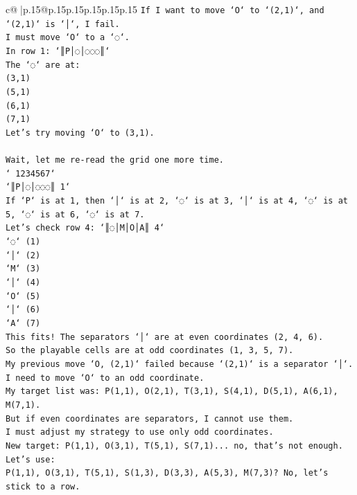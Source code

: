\documentclass{article}
\begin{document}
{\begin{supertabular}{c@{$\;$}|p{.15\linewidth}@{}p{.15\linewidth}p{.15\linewidth}p{.15\linewidth}p{.15\linewidth}p{.15\linewidth}}
{{{\texttt{If I want to move `O` to `(2,1)`, and `(2,1)` is `│`, I fail.} \\
\texttt{I must move `O` to a `◌`.} \\
\texttt{In row 1: `║P│◌│◌◌◌║`} \\
\texttt{The `◌` are at:} \\
\texttt{(3,1)} \\
\texttt{(5,1)} \\
\texttt{(6,1)} \\
\texttt{(7,1)} \\
\texttt{Let's try moving `O` to (3,1).} \\
\\ 
\texttt{Wait, let me re{-}read the grid one more time.} \\
\texttt{` 1234567`} \\
\texttt{`║P│◌│◌◌◌║ 1`} \\
\texttt{If `P` is at 1, then `│` is at 2, `◌` is at 3, `│` is at 4, `◌` is at 5, `◌` is at 6, `◌` is at 7.} \\
\texttt{Let's check row 4: `║◌│M│O│A║ 4`} \\
\texttt{`◌` (1)} \\
\texttt{`│` (2)} \\
\texttt{`M` (3)} \\
\texttt{`│` (4)} \\
\texttt{`O` (5)} \\
\texttt{`│` (6)} \\
\texttt{`A` (7)} \\
\texttt{This fits! The separators `│` are at even coordinates (2, 4, 6).} \\
\texttt{So the playable cells are at odd coordinates (1, 3, 5, 7).} \\
\texttt{My previous move `O, (2,1)` failed because `(2,1)` is a separator `│`.} \\
\texttt{I need to move `O` to an odd coordinate.} \\
\texttt{My target list was: P(1,1), O(2,1), T(3,1), S(4,1), D(5,1), A(6,1), M(7,1).} \\
\texttt{But if even coordinates are separators, I cannot use them.} \\
\texttt{I must adjust my strategy to use only odd coordinates.} \\
\texttt{New target: P(1,1), O(3,1), T(5,1), S(7,1)... no, that's not enough.} \\
\texttt{Let's use:} \\
\texttt{P(1,1), O(3,1), T(5,1), S(1,3), D(3,3), A(5,3), M(7,3)? No, let's stick to a row.} \\
}}}
\end{supertabular}}
\end{document}
